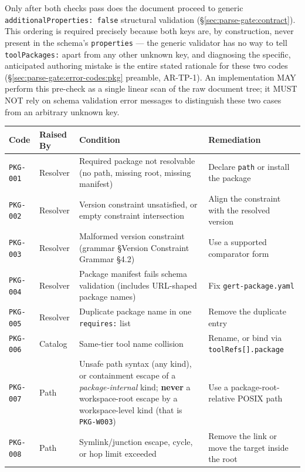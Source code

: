 Only after both checks pass does the document proceed to generic
\texttt{additionalProperties: false} structural validation
(\S\ref{sec:parse-gate:contract}). This ordering is required precisely
because both keys are, by construction, never present in the schema's
\texttt{properties} — the generic validator has no way to tell
\texttt{toolPackages:} apart from any other unknown key, and diagnosing the
specific, anticipated authoring mistake is the entire stated rationale for
these two codes (\S\ref{sec:parse-gate:error-codes:pkg} preamble, AR-TP-1).
An implementation MAY perform this pre-check as a single linear scan of the
raw document tree; it MUST NOT rely on schema validation error messages to
distinguish these two cases from an arbitrary unknown key.

\begin{center}\small
\begin{tabular}{p{2.3cm}p{1.9cm}p{6.3cm}p{3.6cm}}
\hline
\textbf{Code} & \textbf{Raised By} & \textbf{Condition} & \textbf{Remediation} \\
\hline
\texttt{PKG-001} & Resolver & Required package not resolvable (no path, missing root, missing manifest) & Declare \texttt{path} or install the package \\
\texttt{PKG-002} & Resolver & Version constraint unsatisfied, or empty constraint intersection & Align the constraint with the resolved version \\
\texttt{PKG-003} & Resolver & Malformed version constraint (grammar \S Version Constraint Grammar \S4.2) & Use a supported comparator form \\
\texttt{PKG-004} & Resolver & Package manifest fails schema validation (includes URL-shaped package names) & Fix \texttt{gert-package.yaml} \\
\texttt{PKG-005} & Resolver & Duplicate package name in one \texttt{requires:} list & Remove the duplicate entry \\
\texttt{PKG-006} & Catalog & Same-tier tool name collision & Rename, or bind via \texttt{toolRefs[].package} \\
\texttt{PKG-007} & Path & Unsafe path syntax (any kind), or containment escape of a \textit{package-internal} kind; \textbf{never} a workspace-root escape by a workspace-level kind (that is \texttt{PKG-W003}) & Use a package-root-relative POSIX path \\
\texttt{PKG-008} & Path & Symlink/junction escape, cycle, or hop limit exceeded & Remove the link or move the target inside the root \\

\end{tabular}
\end{center}
